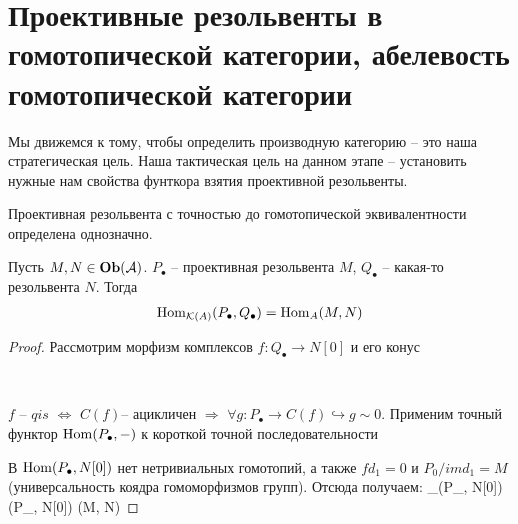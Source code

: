 \section{Проективные резольвенты в гомотопической категории, абелевость гомотопической категории}
Мы движемся к тому, чтобы определить производную категорию -- это наша стратегическая цель. Наша тактическая цель на данном этапе -- установить  нужные нам свойства фунткора взятия проективной резольвенты.
\begin{to_com}
Проективная резольвента с точностью до гомотопической эквивалентности определена однозначно.
\end{to_com}
\begin{to_suj}
Пусть $M, N \in \textbf{Ob}(\mathcal{A})$. $P_\bullet$ -- проективная резольвента $M$, $Q_\bullet$ -- какая-то резольвента $N$.
Тогда 
\begin{align*}
\operatorname{Hom}_{\mathcal{K}(A)}(P_\bullet, Q_\bullet) = \operatorname{Hom}_{A}(M, N)
\end{align*}
\end{to_suj}
\begin{proof}
Рассмотрим морфизм комплексов $f\colon Q_\bullet \to N[0] $ и его конус \\
\bee
{}
\eee
$f$ -- $qis$ $\Leftrightarrow$ $C(f)$-- ацикличен $\Rightarrow$ $\forall g: P_\bullet \rightarrow C(f) \hookrightarrow g \sim 0$. Применим точный функтор $\operatorname{Hom}(P_\bullet, -)$ к короткой точной последовательности 
\begin{center}
\end{center}
В $\operatorname{Hom}(P_\bullet, N[0])$ нет нетривиальных гомотопий, а также $f d_1 = 0$ и $P_0/im d_1 = M$(универсальность коядра гомоморфизмов групп). Отсюда получаем:
\bee
\Hom_{}(P_\bullet, N[0]) \cong \Hom(P_\bullet, N[0]) \cong \Hom(M, N)
\eee
\end{proof}
